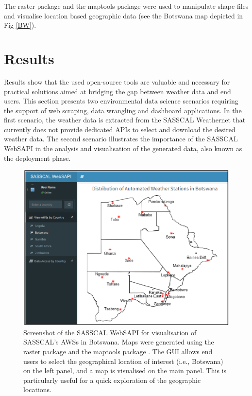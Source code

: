 \documentclass[a4paper, 10pt, conference]{ieeeconf}      %
\begin{document}
\noindent
The raster package \cite{hijmans2015package} and the maptools package \cite{bivand2013maptools} were used to manipulate   shape-files and visualise location based geographic data (see the Botswana map depicted in Fig \ref{BW}).

\section{Results}
\label{Resul}
\noindent
Results show that the used open-source tools are valuable and necessary  for practical solutions aimed at bridging the gap between weather data and end users. 
This section presents two environmental data science scenarios requiring the support of web scraping, data wrangling and dashboard applications. 
In the first scenario, the weather data is  extracted from the SASSCAL Weathernet that currently does not  provide dedicated APIs to select and download the desired weather data. 
The second scenario illustrates the importance of the SASSCAL WebSAPI in the analysis and visualisation of the generated data, also known as the deployment phase.  

\newpage
\noindent
\onecolumn
\begin{figure}
	\centering
	\includegraphics[width=0.9\linewidth]{fig/BW}
	\caption{Screenshot of the SASSCAL WebSAPI for visualisation of SASSCAL's AWSs in Botswana. Maps were generated using the raster package \cite{hijmans2015package} and the maptools package \cite{bivand2013maptools}.  The GUI allows end users to select the geographical location of interest (i.e., Botswana) on the left panel, and a map is visualised on the main panel. 
This is particularly useful for a quick exploration of the geographic locations. %
	\label{BW}
}
	\label{SASSCAL_WebSAPI}
\end{figure}
\end{document}
